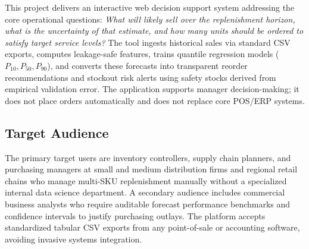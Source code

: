 \documentclass[11pt,a4paper]{article}
\begin{document}
This project delivers an interactive web decision support system addressing the core operational questions: \emph{What will likely sell over the replenishment horizon, what is the uncertainty of that estimate, and how many units should be ordered to satisfy target service levels?} The tool ingests historical sales via standard CSV exports, computes leakage-safe features, trains quantile regression models ($P_{10}, P_{50}, P_{90}$), and converts these forecasts into transparent reorder recommendations and stockout risk alerts using safety stocks derived from empirical validation error. The application supports manager decision-making; it does not place orders automatically and does not replace core POS/ERP systems.

\subsection{Target Audience}
The primary target users are inventory controllers, supply chain planners, and purchasing managers at small and medium distribution firms and regional retail chains who manage multi-SKU replenishment manually without a specialized internal data science department. A secondary audience includes commercial business analysts who require auditable forecast performance benchmarks and confidence intervals to justify purchasing outlays. The platform accepts standardized tabular CSV exports from any point-of-sale or accounting software, avoiding invasive systems integration.
\end{document}

